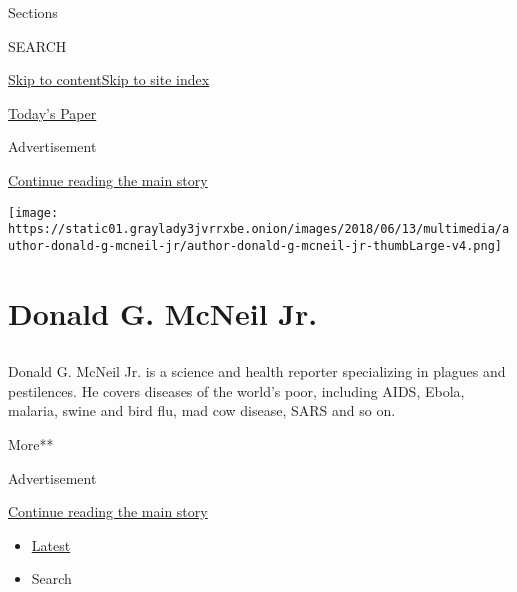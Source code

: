 Sections

SEARCH

\protect\hyperlink{site-content}{Skip to
content}\protect\hyperlink{site-index}{Skip to site index}

\href{https://myaccount.nytimes3xbfgragh.onion/auth/login?response_type=cookie\&client_id=vi}{}

\href{https://www.nytimes3xbfgragh.onion/section/todayspaper}{Today's
Paper}

Advertisement

\protect\hyperlink{after-top}{Continue reading the main story}

\texttt{[image: https://static01.graylady3jvrrxbe.onion/images/2018/06/13/multimedia/author-donald-g-mcneil-jr/author-donald-g-mcneil-jr-thumbLarge-v4.png]}

\hypertarget{donald-g-mcneil-jr}{%
\section{Donald G. McNeil Jr.}\label{donald-g-mcneil-jr}}

\subsection{}

Donald G. McNeil Jr. is a science and health reporter specializing in
plagues and pestilences. He covers diseases of the world's poor,
including AIDS, Ebola, malaria, swine and bird flu, mad cow disease,
SARS and so on.

More**

Advertisement

\protect\hyperlink{after-mid1}{Continue reading the main story}

\begin{itemize}
\tightlist
\item
  \protect\hyperlink{stream-panel}{Latest}
\item
  Search
\end{itemize}

